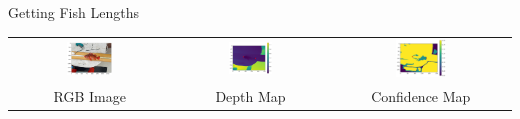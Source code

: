 \begin{frame}{Getting Fish Lengths}
    \centering
    \begin{tabular}{ccc}
        \includegraphics[width=0.3\textwidth]{images/rgb1.png} &
        \includegraphics[width=0.3\textwidth]{images/depth1.png} &
        \includegraphics[width=0.3\textwidth]{images/confidence1.png} \\
        \small RGB Image & \small Depth Map & \small Confidence Map \\
    \end{tabular}
\end{frame}


